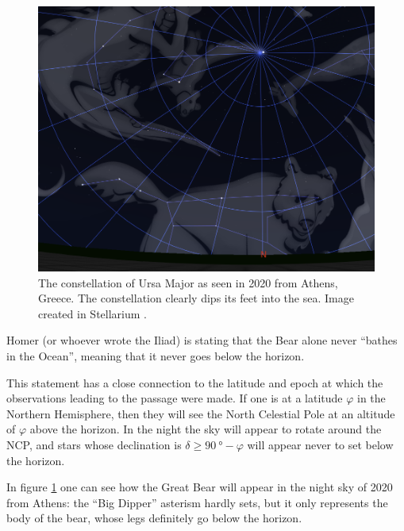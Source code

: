 \documentclass[main.tex]{subfiles}
\begin{document}
\begin{figure}[ht]
\centering
\includegraphics[width=\textwidth]{figures/ursa_maior_today.png}
\caption{The constellation of Ursa Major as seen in 2020 from Athens, Greece. The constellation clearly dips its feet into the sea. Image created in Stellarium \cite[]{stellariumcontributorsStellariumAstronomySoftware2020}.}
\label{fig:ursa-now}
\end{figure}

Homer (or whoever wrote the Iliad) is stating that the Bear alone never ``bathes in the Ocean'', meaning that it never goes below the horizon. 

This statement has a close connection to the latitude and epoch at which the observations leading to the passage were made. 
If one is at a latitude \(\varphi \) in the Northern Hemisphere, then they will see the North Celestial Pole at an altitude of \(\varphi \) above the horizon. In the night the sky will appear to rotate around the NCP, and stars whose declination is \(\delta \geq \SI{90}{\degree} - \varphi \) will appear never to set below the horizon. 

In figure \ref{fig:ursa-now} one can see how the Great Bear will appear in the night sky of 2020 from Athens: the ``Big Dipper'' asterism hardly sets, but it only represents the body of the bear, whose legs definitely go below the horizon. 
\end{document}
